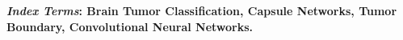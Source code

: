 \documentclass{article}
\begin{document}
\begin{abstract}

\end{abstract}
\textbf{\textit{Index Terms}: Brain Tumor Classification, Capsule Networks, Tumor Boundary, Convolutional Neural Networks.}
%
\end{document}
